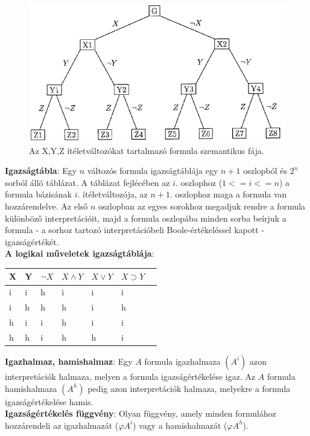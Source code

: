 \documentclass[margin=0px]{article}
\begin{document}
	\begin{figure}[H]
		\centering
		\includegraphics[width=0.6\linewidth]{img/szemantikusfa}
		\caption{Az X,Y,Z ítéletváltozókat tartalmazó formula szemantikus fája.}
		\label{fig:szemantikusfa}
	\end{figure}
	
	\noindent \textbf{Igazságtábla}: Egy $n$ változós formula igazságtáblája egy $n+1$ oszlopból és $2^{n}$ sorból álló táblázat.
	A táblázat fejlécében az $i$. oszlophoz ($1<=i<=n$) a formula bázisának $i$. ítéletváltozója, az $n+1$. oszlophoz maga a formula
	van hozzárendelve. Az első $n$ oszlopban az egyes sorokhoz megadjuk rendre a formula különböző interpretációit, majd a formula
	oszlopába minden sorba beírjuk a formula - a sorhoz tartozó interpretációbeli Boole-értékeléssel kapott - igazságértékét.\\
	
	\noindent \textbf{A logikai műveletek igazságtáblája}:
	
	\begin{table}[H]
		\begin{tabular}{ll|lllll}
			X & Y & $\neg X$ & $X \wedge Y$ & $X \vee Y$  & $ X \supset Y$ &  \\ \hline
			i & i & h & i & i & i &  \\
			i & h & h & h & i & h &  \\
			h & i & i & h & i & i &  \\
			h & h & i & h & h & i & 
		\end{tabular}
	\end{table}
	
	\noindent \textbf{Igazhalmaz, hamishalmaz}: Egy $A$ formula igazhalmaza $(A^{i})$
	azon interpretációk halmaza, melyen a formula igazságértékelése igaz. Az $A$ formula
	hamishalmaza $(A^{h})$ pedig azon interpretációk halmaza, melyekre a formula igazságértékelése hamis.\\
	
	\noindent \textbf{Igazságértékelés függvény}:  Olyan függvény, amely minden formulához hozzárendeli az igazhalmazát ($\varphi A^{i}$) vagy
	a hamishalmazát ($\varphi A^{h}$).\\
	
\end{document}
